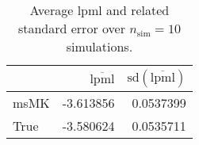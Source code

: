 \begin{table}[H]

\caption{Average lpml and related standard error over $n_{\text{sim}} = 10$ simulations.}
\centering
\begin{tabular}[t]{lrr}
\toprule
  & $\overbar{\text{lpml}}$ & $\text{sd}(\overbar{\text{lpml}})$\\
\midrule
msMK & -3.613856 & 0.0537399\\
True & -3.580624 & 0.0535711\\
\bottomrule
\end{tabular}
\end{table}